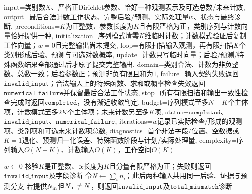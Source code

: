 \begin{AlgorithmContract}{
  input={类别数$K$、严格正Dirichlet参数、恰好一种观测表示及可选总数/未来计数},
  output={最后合法计数工作状态、完整后验/预测、实际处理量$w$、状态与最终诊断},
  preconditions={$K$为正整数，参数长度为$K$且有限严格为正，类别序列与计数向量恰好提供一种},
  initialization={序列模式清零$K$维临时计数；计数模式验证后复制工作向量；$w=0$且完整输出尚未提交},
  loop={有限扫描输入观测，再有限扫描$K$个类别形成后验、预测与可选对数概率},
  update={计数只写临时向量；后验/预测/特殊函数结果全部通过后才原子提交完整输出},
  domain={类别合法、计数为非负整数、总数一致；后验参数正；预测非负有限且和为$1$},
  failure={输入契约失败返回$\mathtt{invalid\_input}$；合法输入上的特殊函数、求和或概率检查失效返回$\mathtt{numerical\_failure}$并保留最后合法工作状态},
  stop={所有有限扫描和输出一致性检查完成时返回$\mathtt{completed}$，没有渐近收敛判定},
  budget={序列模式至多$N+K$个主体项，计数模式至多$2K$个主体项；未来计数另至多$K$项},
  status={$\mathtt{completed}$、$\mathtt{invalid\_input}$、$\mathtt{numerical\_failure}$},
  iterations={$w$记录已实际检查/形成的观测项、类别项和可选未来计数项总数},
  diagnostics={首个非法字段/位置、空数据或$K=1$退化、预测归一化误差、特殊函数阶段与计划/实际处理量},
  complexity={序列输入$O(N+K)$、计数输入$O(K)$，工作空间$O(K)$}
}
\begin{algorithm}[H]
\caption{\DirichletMultinomial{}闭式更新与后验预测}\label{alg:V5-C05-closed-form-update}
$w\leftarrow0$\;
核验$K$是正整数、$\boldsymbol\alpha$长度为$K$且分量有限严格为正；失败则返回$\mathtt{invalid\_input}$及字段诊断\;
令$N\leftarrow\sum_i n_i$；此后两种输入共用同一后验、证据与预测分支\;
若提供$N_{\rm in}$但$N_{\rm in}\ne N$，则返回$\mathtt{invalid\_input}$及$\mathtt{total\_mismatch}$诊断\;

\end{algorithm}
\end{AlgorithmContract}
